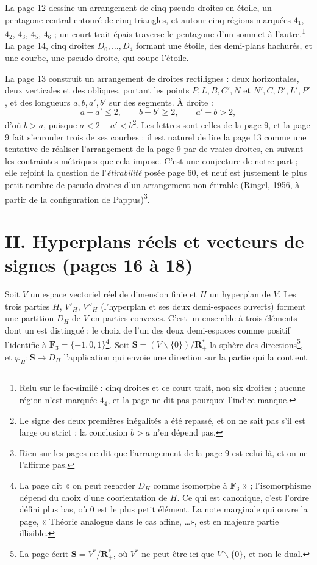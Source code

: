 \documentclass[11pt,a4paper]{article}
\begin{document}
La page 12 dessine un arrangement de cinq pseudo-droites en étoile, un
pentagone central entouré de cinq triangles, et autour cinq régions marquées
$4_1$, $4_2$, $4_3$, $4_5$, $4_6$ ; un court trait épais traverse le
pentagone d'un sommet à l'autre.\footnote{Relu sur le fac-similé : cinq
droites et ce court trait, non six droites ; aucune région n'est marquée
$4_4$, et la page ne dit pas pourquoi l'indice manque.} La page
14, cinq droites $D_0, \ldots, D_4$ formant une étoile, des demi-plans
hachurés, et une courbe, une pseudo-droite, qui coupe l'étoile.

La page 13 construit un arrangement de droites rectilignes : deux
horizontales, deux verticales et des obliques, portant les points $P, L, B,
C', N$ et $N', C, B', L', P'$, et des longueurs $a, b, a', b'$ sur des
segments. À droite :
\[
a + a' \leqslant 2, \qquad b + b' \geqslant 2, \qquad a' + b > 2,
\]
d'où $b > a$, puisque $a < 2 - a' < b$\footnote{Le signe des deux premières
inégalités a été repassé, et on ne sait pas s'il est large ou strict ; la
conclusion $b > a$ n'en dépend pas.}. Les lettres sont celles de la page 9,
et la page 9 fait s'enrouler trois de ses courbes : il est naturel de lire
la page 13 comme une tentative de réaliser l'arrangement de la page 9 par de
vraies droites, en suivant les contraintes métriques que cela impose. C'est
une conjecture de notre part ; elle rejoint la question de
l'\emph{étirabilité} posée page 60, et neuf est justement le plus petit
nombre de pseudo-droites d'un arrangement non étirable (Ringel, 1956, à
partir de la configuration de Pappus)\footnote{Rien sur les pages ne dit que
l'arrangement de la page 9 est celui-là, et on ne l'affirme pas.}.

\section*{II. Hyperplans réels et vecteurs de signes (pages 16 à 18)}

Soit $V$ un espace vectoriel réel de dimension finie et $H$ un hyperplan de
$V$. Les trois parties $H$, $V'_H$, $V''_H$ (l'hyperplan et ses deux
demi-espaces ouverts) forment une partition $D_H$ de $V$ en parties
convexes. C'est un ensemble à trois éléments dont un est distingué ; le
choix de l'un des deux demi-espaces comme positif l'identifie à
$\mathbf{F}_3 = \{-1, 0, 1\}$\footnote{La page dit « on peut regarder $D_H$
comme isomorphe à $\mathbf{F}_3$ » ; l'isomorphisme dépend du choix d'une
coorientation de $H$. Ce qui est canonique, c'est l'ordre défini plus bas,
où $0$ est le plus petit élément. La note marginale qui ouvre la page,
« Théorie analogue dans le cas affine, \ldots », est en majeure partie
illisible.}. Soit $\mathbf{S} = (V \smallsetminus \{0\})/\mathbf{R}^{*}_{+}$ la
sphère des directions\footnote{La page écrit $\mathbf{S} = V^{*}/\mathbf{R}^{*}_{+}$,
où $V^{*}$ ne peut être ici que $V \smallsetminus \{0\}$, et non le dual.}, et
$\varphi_H : \mathbf{S} \to D_H$ l'application qui envoie une direction sur la
partie qui la contient.
\end{document}
